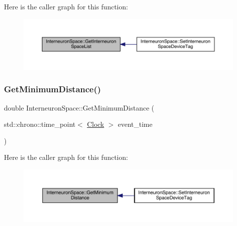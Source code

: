 Here is the caller graph for this function\+:\nopagebreak
\begin{figure}[H]
\begin{center}
\leavevmode
\includegraphics[width=350pt]{class_interneuron_space_ae77729a0c140cfb8a9121e898be791b2_icgraph}
\end{center}
\end{figure}
\mbox{\label{class_interneuron_space_a243535a8f09f104c3a4488f6df4cfd57}} 
\subsubsection{\texorpdfstring{Get\+Minimum\+Distance()}{GetMinimumDistance()}}
{\footnotesize\ttfamily double Interneuron\+Space\+::\+Get\+Minimum\+Distance (\begin{DoxyParamCaption}\item[{std\+::chrono\+::time\+\_\+point$<$ \hyperlink{universe_8h_a0ef8d951d1ca5ab3cfaf7ab4c7a6fd80}{Clock} $>$}]{event\+\_\+time }\end{DoxyParamCaption})}

Here is the caller graph for this function\+:\nopagebreak
\begin{figure}[H]
\begin{center}
\leavevmode
\includegraphics[width=350pt]{class_interneuron_space_a243535a8f09f104c3a4488f6df4cfd57_icgraph}
\end{center}
\end{figure}
\mbox{\label{class_interneuron_space_a7a60c95c8706cbff3084e74b7b15d75c}} 
